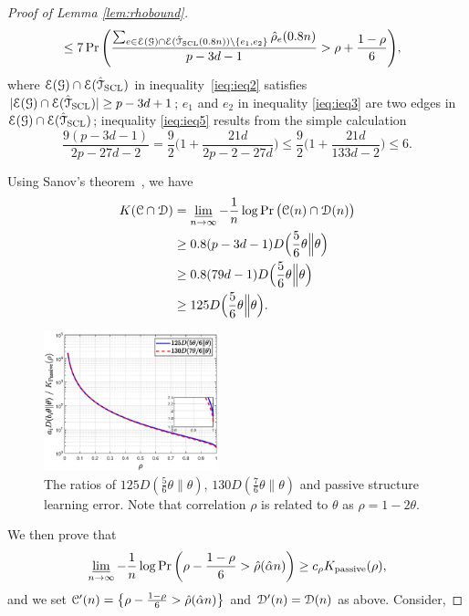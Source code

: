 \begin{proof}[Proof of Lemma \ref{lem:rhobound}]
\begin{align}
		&\leq 7\Pr\Bigg(\frac{\sum_{e\in\mathcal{E}(\mathcal{G})\cap\mathcal{E}( \hat{\mathcal{T}}_{\rm{SCL}}(0.8 n))\backslash \{e_{1},e_{2}\}}\hat{\rho}_{e}(0.8 n)}{p-3d-1}>\rho+\frac{1-\rho}{6}\Bigg),
	\end{align}
	where $\mathcal{E}(\mathcal{G})\cap\mathcal{E}( \hat{\mathcal{T}}_{\rm{SCL}})$ in inequality~\eqref{ieq:ieq2} satisfies $|\mathcal{E}(\mathcal{G})\cap\mathcal{E}( \hat{\mathcal{T}}_{\rm{SCL}})|\geq p-3d+1$; $e_{1}$ and $e_{2} $ in inequality \eqref{ieq:ieq3} are two edges in $\mathcal{E}(\mathcal{G})\cap\mathcal{E}( \hat{\mathcal{T}}_{\rm{SCL}})$; inequality \eqref{ieq:ieq5} results from the simple calculation
	\begin{equation}
	    	\frac{9(p-3d-1)}{2p-27d-2}=\frac{9}{2}\Big(1+\frac{21d}{2p-2-27d}\Big)\leq\frac{9}{2}\Big(1+\frac{21d}{133d-2}\Big)\leq 6.
	\end{equation}

	Using Sanov's theorem~\cite{zeitouni1998large}, we have
	\begin{align}
		K (\mathcal{C}\cap \mathcal{D})&=\varliminf_{n\rightarrow\infty}-\frac{1}{n}\log\Pr\big( \mathcal{C}(n)\cap \mathcal{D}(n)\big)\\
		&\geq 0.8(p-3d-1)D\Big(\frac{5}{6}\theta\Big\|\theta\Big)\\
		&\geq 0.8(79d-1)D\Big(\frac{5}{6}\theta\Big\|\theta\Big)\\
		&\geq 125D\Big(\frac{5}{6}\theta\Big\|\theta\Big).
	\end{align}
	\begin{figure}[t]
		\centering 
		\includegraphics[width=0.45\textwidth]{thetaKL.eps} 
		\caption{The ratios of  $125D(\frac{5}{6}\theta\|\theta)$, $130D(\frac{7}{6}\theta\|\theta)$ and passive structure learning error. Note that correlation $\rho$ is related to $\theta$ as $\rho=1-2\theta$.} 
		\label{fig:thetaKL} 
	\end{figure}
	We then prove that 
	\begin{equation}
	\varliminf_{n\rightarrow\infty}-\frac{1}{n}\log\Pr\bigg(\rho-\frac{1-\rho}{6}>\hat{\rho}(\hat{\alpha} n)\bigg)\geq c_{\rho}K _{{\rm passive}}(\rho),
	\end{equation}
	and we set $ \mathcal{C}^{\prime}(n)=\big\{\rho-\frac{1-\rho}{6}>\hat{\rho}(\hat{\alpha} n)\big\}$ and $\mathcal{D}^{\prime}(n)=\mathcal{D}(n)$ as above. Consider,

\end{proof}
